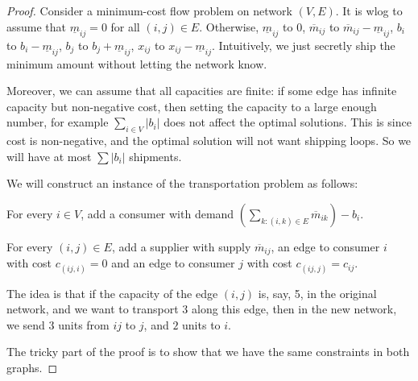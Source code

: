 \documentclass[a4paper]{article}
\begin{document}
\begin{proof}
  Consider a minimum-cost flow problem on network $(V, E)$. It is wlog to assume that $\underline{m}_{ij} = 0$ for all $(i, j) \in E$. Otherwise, $\underline{m}_{ij}$ to $0$, $\overline{m}_{ij}$ to $\overline{m}_{ij} - \underline{m}_{ij}$, $b_i$ to $b_i - \underline{m}_{ij}$, $b_j$ to $b_j + \underline{m}_{ij}$, $x_{ij}$ to $x_{ij} - \underline{m}_{ij}$. Intuitively, we just secretly ship the minimum amount without letting the network know.

  Moreover, we can assume that all capacities are finite: if some edge has infinite capacity but non-negative cost, then setting the capacity to a large enough number, for example $\sum_{i \in V}|b_i|$ does not affect the optimal solutions. This is since cost is non-negative, and the optimal solution will not want shipping loops. So we will have at most $\sum |b_i|$ shipments.

  We will construct an instance of the transportation problem as follows:

  For every $i\in V$, add a consumer with demand $\left(\sum_{k: (i, k)\in E}\overline{m}_{ik}\right) - b_i$.

  For every $(i, j)\in E$, add a supplier with supply $\overline{m}_{ij}$, an edge to consumer $i$ with cost $c_{(ij, i)} = 0$ and an edge to consumer $j$ with cost $c_{(ij, j)} = c_{ij}$.

  \begin{center}
  \end{center}
  The idea is that if the capacity of the edge $(i, j)$ is, say, 5, in the original network, and we want to transport $3$ along this edge, then in the new network, we send $3$ units from $ij$ to $j$, and $2$ units to $i$.

  The tricky part of the proof is to show that we have the same constraints in both graphs.


\end{proof}
\end{document}
